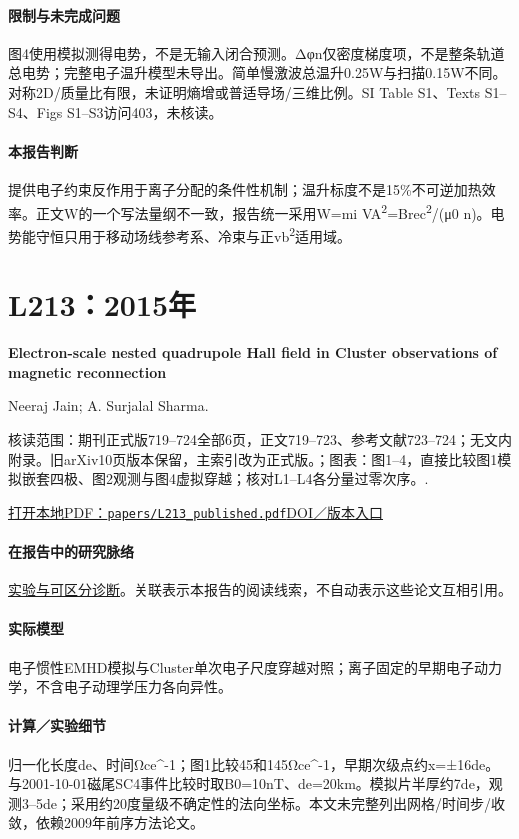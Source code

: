 \paragraph{限制与未完成问题}图4使用模拟测得电势，不是无输入闭合预测。Δφn仅密度梯度项，不是整条轨道总电势；完整电子温升模型未导出。简单慢激波总温升0.25W与扫描0.15W不同。对称2D/质量比有限，未证明熵增或普适导场/三维比例。SI Table S1、Texts S1–S4、Figs S1–S3访问403，未核读。

\paragraph{本报告判断}提供电子约束反作用于离子分配的条件性机制；温升标度不是15\%不可逆加热效率。正文W的一个写法量纲不一致，报告统一采用W=mi VA\textsuperscript{2}=Brec\textsuperscript{2}/(μ0 n)。电势能守恒只用于移动场线参考系、冷束与正vb\textsuperscript{2}适用域。

\section{L213：2015年}\label{paper:L213}

\textbf{Electron-scale nested quadrupole Hall field in Cluster observations of magnetic reconnection}\citep{L213}\

Neeraj Jain;  A. Surjalal Sharma.

\textsf{核读范围：}期刊正式版719–724全部6页，正文719–723、参考文献723–724；无文内附录。旧arXiv10页版本保留，主索引改为正式版。；\textsf{图表：}图1–4，直接比较图1模拟嵌套四极、图2观测与图4虚拟穿越；核对L1–L4各分量过零次序。.

\href{run:papers/L213_published.pdf}{打开本地PDF：\texttt{papers/L213\_published.pdf}}\quad\href{https://doi.org/10.5194/angeo-33-719-2015}{DOI／版本入口}

\paragraph{在报告中的研究脉络}\hyperref[story:diagnostic]{实验与可区分诊断}。关联表示本报告的阅读线索，不自动表示这些论文互相引用。

\paragraph{实际模型}电子惯性EMHD模拟与Cluster单次电子尺度穿越对照；离子固定的早期电子动力学，不含电子动理学压力各向异性。

\paragraph{计算／实验细节}归一化长度de、时间Ωce\textasciicircum{}-1；图1比较45和145Ωce\textasciicircum{}-1，早期次级点约x=±16de。与2001-10-01磁尾SC4事件比较时取B0=10nT、de=20km。模拟片半厚约7de，观测3–5de；采用约20度量级不确定性的法向坐标。本文未完整列出网格/时间步/收敛，依赖2009年前序方法论文。

